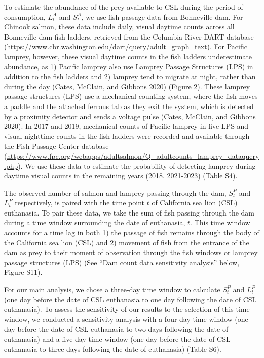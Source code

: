 \documentclass[
]{article}
\begin{document}
To estimate the abundance of the prey available to CSL during the period
of consumption, \(L_t^A\) and \(S_t^A\), we use fish passage data from
Bonneville dam. For Chinook salmon, these data include daily, visual
daytime counts across all Bonneville dam fish ladders, retrieved from
the Columbia River DART database
(\url{https://www.cbr.washington.edu/dart/query/adult_graph_text}). For
Pacific lamprey, however, these visual daytime counts in the fish
ladders underestimate abundance, as 1) Pacific lamprey also use Lamprey
Passage Structures (LPS) in addition to the fish ladders and 2) lamprey
tend to migrate at night, rather than during the day (Cates, McClain,
and Gibbons 2020) (Figure 2). These lamprey passage structures (LPS) use
a mechanical counting system, where the fish moves a paddle and the
attached ferrous tab as they exit the system, which is detected by a
proximity detector and sends a voltage pulse (Cates, McClain, and
Gibbons 2020). In 2017 and 2019, mechanical counts of Pacific lamprey in
five LPS and visual nighttime counts in the fish ladders were recorded
and available through the Fish Passage Center database
(\url{https://www.fpc.org/webapps/adultsalmon/Q_adultcounts_lamprey_dataquery.php}).
We use these data to estimate the probability of detecting lamprey
during daytime visual counts in the remaining years (2018, 2021-2023)
(Table S4).

The observed number of salmon and lamprey passing through the dam,
\(S_t^P\) and \(L_t^P\) respectively, is paired with the time point
\(t\) of California sea lion (CSL) euthanasia. To pair these data, we
take the sum of fish passing through the dam during a time window
surrounding the date of euthanasia, \(t\). This time window accounts for
a time lag in both 1) the passage of fish remains through the body of
the California sea lion (CSL) and 2) movement of fish from the entrance
of the dam as prey to their moment of observation through the fish
windows or lamprey passage structures (LPS) (See ``Dam count data
sensitivity analysis'' below, Figure S11).

For our main analysis, we chose a three-day time window to calculate
\(S_t^P\) and \(L_t^P\) (one day before the date of CSL euthanasia to
one day following the date of CSL euthanasia). To assess the sensitivity
of our results to the selection of this time window, we conducted a
sensitivity analysis with a four-day time window (one day before the
date of CSL euthanasia to two days following the date of euthanasia) and
a five-day time window (one day before the date of CSL euthanasia to
three days following the date of euthanasia) (Table S6).
\end{document}
